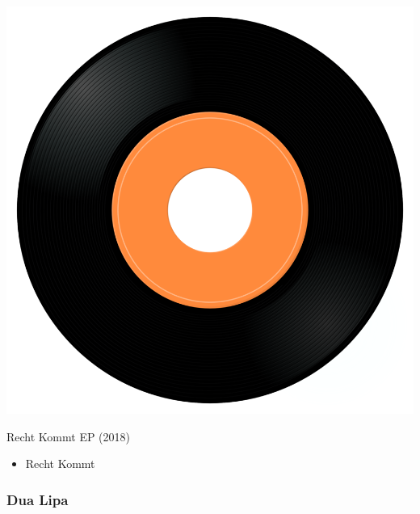 \begin{minipage}[t]{0.25\textwidth}\vspace{0pt}
\captionsetup{type=figure}
\includegraphics[width=\textwidth]{Images/cover.png}
\caption*{Recht Kommt EP (2018)}
\end{minipage}
\begin{minipage}[t]{0.25\textwidth}\vspace{0pt}
\begin{itemize}[nosep,leftmargin=1em,labelwidth=*,align=left]
	\setlength{\itemsep}{0pt}
	\item Recht Kommt
\end{itemize}
\end{minipage}

\subsubsection{Dua Lipa}

